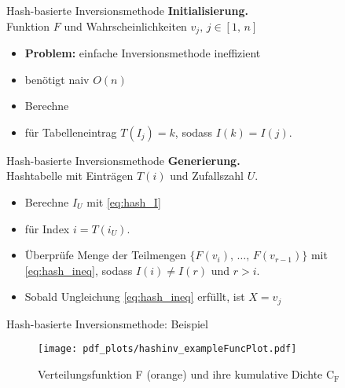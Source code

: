 \begin{frame}{Hash-basierte Inversionsmethode}
    \textbf{Initialisierung.}\\
    Funktion $F$ und Wahrscheinlichkeiten $v_j,\, j \in [1,\, n]$
    \begin{itemize}
        \item<2-> \textbf{Problem:} einfache Inversionsmethode ineffizient
        \item<3->  benötigt naiv $O(n)$
        \item<4-> Berechne 
        \item<5-> für Tabelleneintrag $T(I_j) = k$, sodass $I(k) = I(j)$.
    \end{itemize}
\end{frame}

\begin{frame}{Hash-basierte Inversionsmethode}
    \textbf{Generierung.}\\
    Hashtabelle mit Einträgen $T(i)$ und Zufallszahl $U$.
    \begin{itemize}
        \item<2-> Berechne $I_U$ mit \eqref{eq:hash_I}
        \item<3-> für Index $i = T(i_U)$.
        \item<4-> Überprüfe Menge der Teilmengen $\{F(v_i),\, \dots,\, F(v_{r-1})\}$ mit 
                \eqref{eq:hash_ineq}, sodass $I(i) \neq I(r)$ und $r > i$.
        \item<5-> Sobald Ungleichung \eqref{eq:hash_ineq} erfüllt, ist $X = v_j$
    \end{itemize}
\end{frame}

\begin{frame}{Hash-basierte Inversionsmethode: Beispiel}
    \begin{figure}
        \centering
        \texttt{[image: pdf\_plots/hashinv\_exampleFuncPlot.pdf]}
        \caption{Verteilungsfunktion F (orange) und ihre kumulative Dichte $\mathrm{C_F}$}
    \end{figure}
\end{frame}

